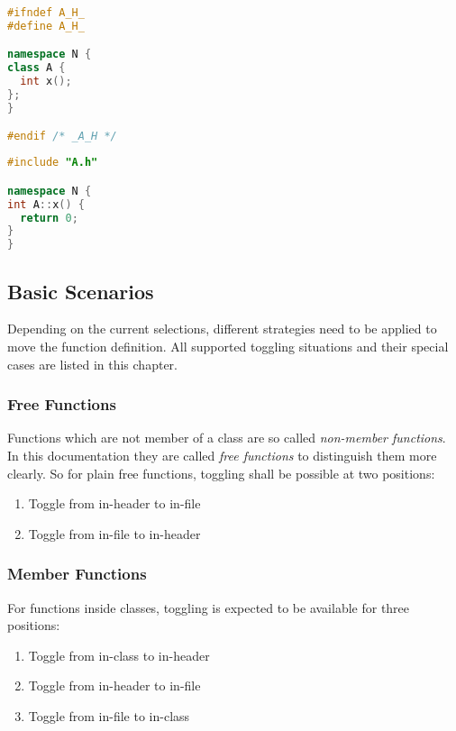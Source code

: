 \vspace{0.5cm}
\begin{minipage}{.48\textwidth}
\lstset{xrightmargin=0.5cm}
\begin{lstlisting}[caption={A.h},label={twofilesolution_header},language=C++]
#ifndef A_H_
#define A_H_

namespace N {
class A {
  int x();
};
}

#endif /* _A_H */
\end{lstlisting}
\end{minipage}%
\begin{minipage}{.48\textwidth}
\lstset{xleftmargin=0.5cm}
\begin{lstlisting}[caption={A.cpp},label={twofilesolution_impl},language=C++]
#include "A.h"

namespace N {
int A::x() { 
  return 0;
}
}
\end{lstlisting}
\end{minipage}

\subsection{Basic Scenarios}

Depending on the current selections, different strategies need to be applied to 
move the function definition. All supported toggling situations and their 
special cases are listed in this chapter.

\subsubsection{Free Functions}
Functions which are not member of a class are so called \textit{non-member
functions}. In this documentation they are called \textit{free functions} to
distinguish them more clearly. So for plain free functions, toggling shall be
possible at two positions:
\begin{enumerate}
\item Toggle from in-header to in-file
\item Toggle from in-file to in-header
\end{enumerate}

\subsubsection{Member Functions}
For functions inside classes, toggling is expected to be available for three 
positions:
\begin{enumerate}
\item Toggle from in-class to in-header
\item Toggle from in-header to in-file
\item Toggle from in-file to in-class
\end{enumerate}

